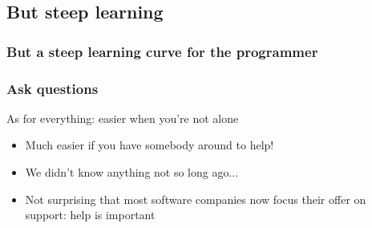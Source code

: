 \documentclass[compress]{beamer}
\begin{document}
\subsection[But]{But steep learning}

\begin{frame}
\frametitle{But a steep learning curve for the programmer}
\begin{overprint}
  \end{overprint}
\end{frame}


\begin{frame}
\frametitle{Ask questions}
\begin{block}{As for everything: easier when you're not alone}
\scriptsize
\begin{itemize}
\item Much easier if you have somebody around to help!
\item We didn't know anything not so long ago...
\item Not surprising that most software companies now focus their offer on support: help is important
\end{itemize}
\end{block}
\end{frame}
     
\end{document}
